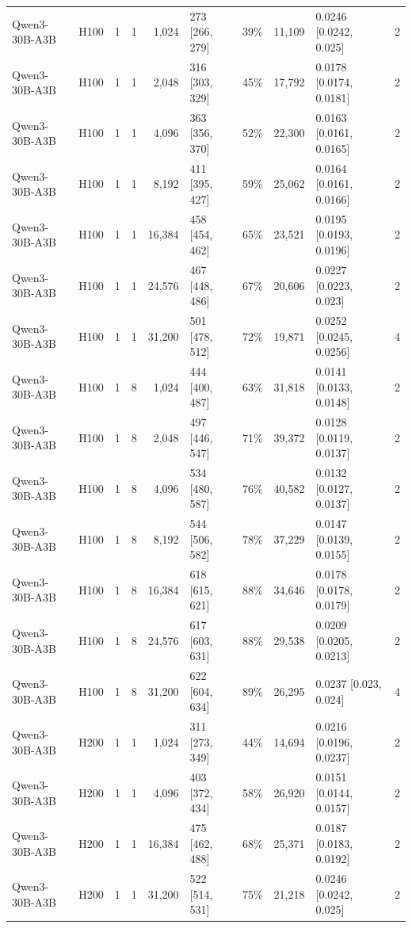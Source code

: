 \begin{landscape}
\begin{longtable}{llrrrlrrlr}
Qwen3-30B-A3B & H100 & 1 & 1 & 1,024 & 273 {[}266, 279{]} & 39\% & 11,109 & 0.0246 {[}0.0242, 0.025{]} & 2 \\
Qwen3-30B-A3B & H100 & 1 & 1 & 2,048 & 316 {[}303, 329{]} & 45\% & 17,792 & 0.0178 {[}0.0174, 0.0181{]} & 2 \\
Qwen3-30B-A3B & H100 & 1 & 1 & 4,096 & 363 {[}356, 370{]} & 52\% & 22,300 & 0.0163 {[}0.0161, 0.0165{]} & 2 \\
Qwen3-30B-A3B & H100 & 1 & 1 & 8,192 & 411 {[}395, 427{]} & 59\% & 25,062 & 0.0164 {[}0.0161, 0.0166{]} & 2 \\
Qwen3-30B-A3B & H100 & 1 & 1 & 16,384 & 458 {[}454, 462{]} & 65\% & 23,521 & 0.0195 {[}0.0193, 0.0196{]} & 2 \\
Qwen3-30B-A3B & H100 & 1 & 1 & 24,576 & 467 {[}448, 486{]} & 67\% & 20,606 & 0.0227 {[}0.0223, 0.023{]} & 2 \\
Qwen3-30B-A3B & H100 & 1 & 1 & 31,200 & 501 {[}478, 512{]} & 72\% & 19,871 & 0.0252 {[}0.0245, 0.0256{]} & 4 \\
Qwen3-30B-A3B & H100 & 1 & 8 & 1,024 & 444 {[}400, 487{]} & 63\% & 31,818 & 0.0141 {[}0.0133, 0.0148{]} & 2 \\
Qwen3-30B-A3B & H100 & 1 & 8 & 2,048 & 497 {[}446, 547{]} & 71\% & 39,372 & 0.0128 {[}0.0119, 0.0137{]} & 2 \\
Qwen3-30B-A3B & H100 & 1 & 8 & 4,096 & 534 {[}480, 587{]} & 76\% & 40,582 & 0.0132 {[}0.0127, 0.0137{]} & 2 \\
Qwen3-30B-A3B & H100 & 1 & 8 & 8,192 & 544 {[}506, 582{]} & 78\% & 37,229 & 0.0147 {[}0.0139, 0.0155{]} & 2 \\
Qwen3-30B-A3B & H100 & 1 & 8 & 16,384 & 618 {[}615, 621{]} & 88\% & 34,646 & 0.0178 {[}0.0178, 0.0179{]} & 2 \\
Qwen3-30B-A3B & H100 & 1 & 8 & 24,576 & 617 {[}603, 631{]} & 88\% & 29,538 & 0.0209 {[}0.0205, 0.0213{]} & 2 \\
Qwen3-30B-A3B & H100 & 1 & 8 & 31,200 & 622 {[}604, 634{]} & 89\% & 26,295 & 0.0237 {[}0.023, 0.024{]} & 4 \\
Qwen3-30B-A3B & H200 & 1 & 1 & 1,024 & 311 {[}273, 349{]} & 44\% & 14,694 & 0.0216 {[}0.0196, 0.0237{]} & 2 \\
Qwen3-30B-A3B & H200 & 1 & 1 & 4,096 & 403 {[}372, 434{]} & 58\% & 26,920 & 0.0151 {[}0.0144, 0.0157{]} & 2 \\
Qwen3-30B-A3B & H200 & 1 & 1 & 16,384 & 475 {[}462, 488{]} & 68\% & 25,371 & 0.0187 {[}0.0183, 0.0192{]} & 2 \\
Qwen3-30B-A3B & H200 & 1 & 1 & 31,200 & 522 {[}514, 531{]} & 75\% & 21,218 & 0.0246 {[}0.0242, 0.025{]} & 2 \\

\end{longtable}
\end{landscape}
